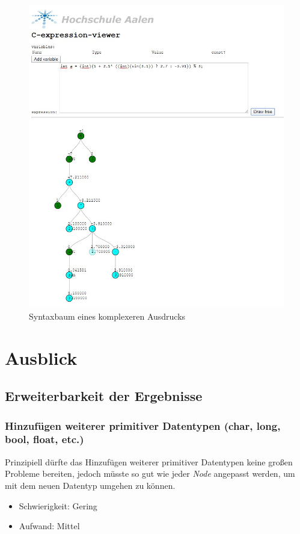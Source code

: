 \documentclass[oneside]{ausarbeitung}
\begin{document}
\begin{figure}[htbp]
  \centering
  \includegraphics[width=0.8\textheight]{images/result.jpg}
  \caption{Syntaxbaum eines komplexeren Ausdrucks}
  \label{fig:result}
\end{figure}

\section{Ausblick}
\label{sec:ausblick}

\subsection{Erweiterbarkeit der Ergebnisse}
\label{sub:erweiterbarkeit}

\subsubsection{Hinzufügen weiterer primitiver Datentypen (char, long, bool, float, etc.)}
Prinzipiell dürfte das Hinzufügen weiterer primitiver Datentypen keine großen Probleme bereiten, jedoch müsste so gut wie jeder \textit{Node} angepasst werden, um mit dem neuen Datentyp umgehen zu können.
\begin{itemize}
\item{Schwierigkeit: Gering}
\item{Aufwand: Mittel}
\end{itemize}
\end{document}
